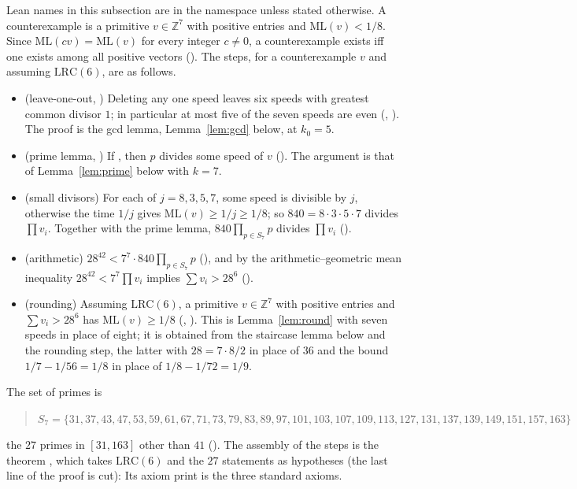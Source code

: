 \documentclass[11pt]{article}
\theoremstyle{remark}
\newcommand{\ML}{\mathrm{ML}}
\newcommand{\Z}{\mathbb{Z}}
\begin{document}
Lean names in this subsection are in the namespace  unless stated otherwise. A counterexample is a primitive $v\in\Z^7$ with positive entries and $\ML(v)<1/8$. Since $\ML(cv)=\ML(v)$ for every integer $c\neq0$, a counterexample exists iff one exists among all positive vectors (). The steps, for a counterexample $v$ and assuming $\mathrm{LRC}(6)$, are as follows.
\begin{itemize}
\item (leave-one-out, \cite[Lemma~5]{Ros8}) Deleting any one speed leaves six speeds with greatest common divisor $1$; in particular at most five of the seven speeds are even (, ). The proof is the gcd lemma, Lemma~\ref{lem:gcd} below, at $k_0=5$.
\item (prime lemma, \cite[Lemmas~6,~7]{Ros8}) If , then $p$ divides some speed of $v$ (). The argument is that of Lemma~\ref{lem:prime} below with $k=7$.
\item (small divisors) For each of $j=8,3,5,7$, some speed is divisible by $j$, otherwise the time $1/j$ gives $\ML(v)\ge 1/j\ge1/8$; so $840=8\cdot3\cdot5\cdot7$ divides $\prod v_i$. Together with the prime lemma, $840\prod_{p\in S_7}p$ divides $\prod v_i$ ().
\item (arithmetic) $28^{42}<7^7\cdot840\prod_{p\in S_7}p$ (), and by the arithmetic--geometric mean inequality $28^{42}<7^7\prod v_i$ implies $\sum v_i>28^6$ ().
\item (rounding) Assuming $\mathrm{LRC}(6)$, a primitive $v\in\Z^7$ with positive entries and $\sum v_i>28^6$ has $\ML(v)\ge1/8$ (, ). This is Lemma~\ref{lem:round} with seven speeds in place of eight; it is obtained from the staircase lemma below and the rounding step, the latter with $28=7\cdot8/2$ in place of $36$ and the bound $1/7-1/56=1/8$ in place of $1/8-1/72=1/9$.
\end{itemize}
The set of primes is
\begin{quote}\small\raggedright$S_7=\{31,\allowbreak 37,\allowbreak 43,\allowbreak 47,\allowbreak 53,\allowbreak 59,\allowbreak 61,\allowbreak 67,\allowbreak 71,\allowbreak 73,\allowbreak 79,\allowbreak 83,\allowbreak 89,\allowbreak 97,\allowbreak 101,\allowbreak 103,\allowbreak 107,\allowbreak 109,\allowbreak 113,\allowbreak 127,\allowbreak 131,\allowbreak 137,\allowbreak 139,\allowbreak 149,\allowbreak 151,\allowbreak 157,\allowbreak 163\}$\end{quote}
the $27$ primes in $[31,163]$ other than $41$ (). The assembly of the steps is the theorem , which takes $\mathrm{LRC}(6)$ and the $27$ statements  as hypotheses (the last line of the proof is cut):
Its axiom print is the three standard axioms.
\end{document}
